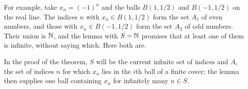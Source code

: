 For example, take $x_n=(-1)^n$ and the balls $B(1,1/2)$ and $B(-1,1/2)$ on the real line. The indices $n$ with $x_n\in B(1,1/2)$ form the set $A_1$ of even numbers, and those with $x_n\in B(-1,1/2)$ form the set $A_2$ of odd numbers. Their union is $\mathbb N$, and the lemma with $S=\mathbb N$ promises that at least one of them is infinite, without saying which. Here both are.

In the proof of the theorem, $S$ will be the current infinite set of indices and $A_i$ the set of indices $n$ for which $x_n$ lies in the $i$th ball of a finite cover; the lemma then supplies one ball containing $x_n$ for infinitely many $n\in S$.

